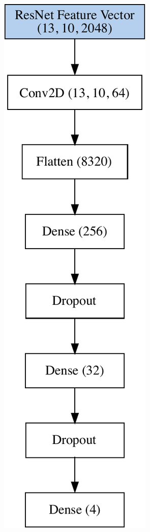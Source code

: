 \begin{figure}[h!]
\begin{subfigure}[b]{0.3\linewidth}
    \includegraphics[width=0.7\linewidth]{graphics/image-classification-results/model/resnet.pdf} 

\end{subfigure}
\end{figure}
